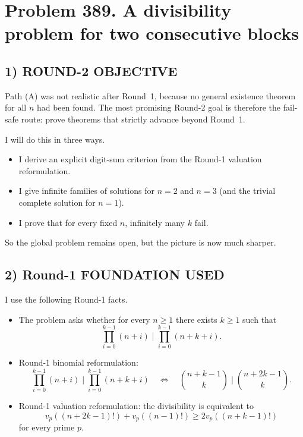 \section*{Problem 389. A divisibility problem for two consecutive blocks}

\subsection*{1) ROUND-2 OBJECTIVE}

Path (A) was not realistic after Round~1, because no general existence theorem for all $n$ had been found.  The most promising Round-2 goal is therefore the fail-safe route: prove theorems that strictly advance beyond Round~1.

I will do this in three ways.

\begin{itemize}
\item I derive an explicit digit-sum criterion from the Round-1 valuation reformulation.
\item I give infinite families of solutions for $n=2$ and $n=3$ (and the trivial complete solution for $n=1$).
\item I prove that for every fixed $n$, infinitely many $k$ fail.
\end{itemize}

So the global problem remains open, but the picture is now much sharper.

\subsection*{2) Round-1 FOUNDATION USED}

I use the following Round-1 facts.

\begin{itemize}
\item The problem asks whether for every $n\ge 1$ there exists $k\ge 1$ such that
\[
\prod_{i=0}^{k-1}(n+i)\mid \prod_{i=0}^{k-1}(n+k+i).
\]

\item Round-1 binomial reformulation:
\[
\prod_{i=0}^{k-1}(n+i)\mid \prod_{i=0}^{k-1}(n+k+i)
\quad\Leftrightarrow\quad
{n+k-1\choose k}\mid {n+2k-1\choose k}.
\]

\item Round-1 valuation reformulation:
the divisibility is equivalent to
\[
v_p\!\left((n+2k-1)!\right)+v_p\!\left((n-1)!\right)\ge 2v_p\!\left((n+k-1)!\right)
\]
for every prime $p$.
\end{itemize}

